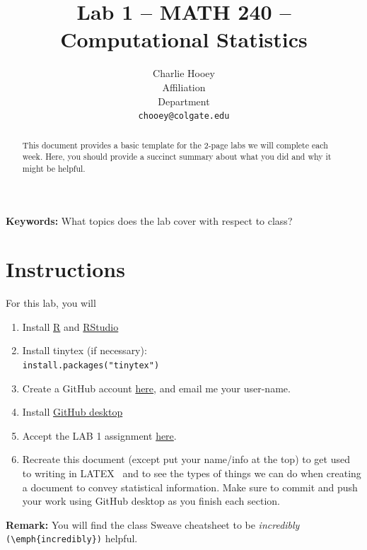 \documentclass{article}\usepackage[]{graphicx}\usepackage[]{xcolor}
\begin{document}
\vspace{-1in}
\title{Lab 1 -- MATH 240 -- Computational Statistics}

\author{
  Charlie Hooey \\
  Affiliation  \\
  Department  \\
  {\tt chooey@colgate.edu}
}

\date{}

\maketitle

\begin{multicols}{2}
\begin{abstract}
This document provides a basic template for the 2-page labs we will complete each week. Here, you should provide a succinct summary about what you did and why it might be helpful.
\end{abstract}

\textbf{Keywords:} What topics does the lab cover with respect to class?

\section{Instructions}
\noindent For this lab, you will 
\begin{enumerate}[1.]\itemsep0em
\item Install \href{https://cran.rstudio.com/}{R} and \href{https://cran.rstudio.com/}{RStudio}
\item Install tinytex (if necessary): \\\texttt{install.packages("tinytex")}
\item Create a GitHub account \href{https://github.com/}{here}, and email me your user-name.
\item Install \href{https://desktop.github.com/}{GitHub desktop}
\item Accept the LAB 1 assignment \href{https://classroom.github.com/a/gfC_xMMl}{here}.
\item Recreate this document (except put your name/info at the top) to get used to writing in LATEX~ and to see the types of things we can do when creating a document to convey statistical information. Make sure to commit and push your work using GitHub desktop as you finish each section.
\end{enumerate}
\noindent \textbf{Remark:} You will find the class Sweave cheatsheet to be \emph{incredibly} \verb|(\emph{incredibly})| helpful.

\end{multicols}
\end{document}
